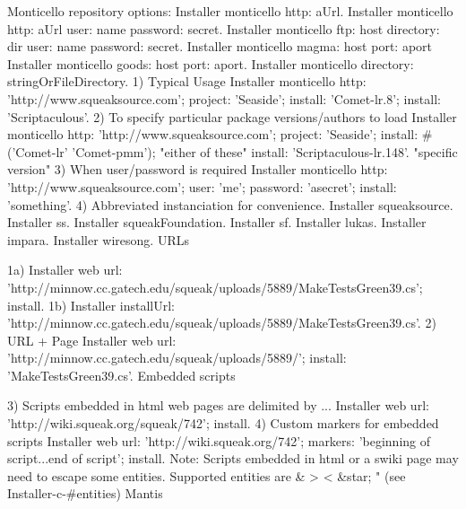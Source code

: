 \documentclass[a4paper,10pt,twoside]{book}
\begin{document}
Monticello repository options:
Installer monticello http: aUrl.
Installer monticello http: aUrl user: name password: secret.
Installer monticello ftp: host directory: dir user: name password: secret.
Installer monticello magma: host port: aport
Installer monticello goods: host port: aport.
Installer monticello directory: stringOrFileDirectory.
1) Typical Usage 
 Installer monticello http: 'http://www.squeaksource.com';
    project: 'Seaside';
    install: 'Comet-lr.8'; 
    install: 'Scriptaculous'.
2) To specify particular package versions/authors to load
 Installer monticello http: 'http://www.squeaksource.com';
       project: 'Seaside';
       install: #('Comet-lr' 'Comet-pmm');  "either of these"
       install: 'Scriptaculous-lr.148'. "specific version"
3) When user/password is required
 Installer monticello http: 'http://www.squeaksource.com';
    user: 'me'; password: 'asecret';
    install: 'something'.
4) Abbreviated instanciation for convenience.
Installer squeaksource.
Installer ss.
Installer squeakFoundation.
Installer sf.
Installer lukas.
Installer impara.
Installer wiresong.
URLs

1a)
Installer web url: 'http://minnow.cc.gatech.edu/squeak/uploads/5889/MakeTestsGreen39.cs'; install.
1b)
Installer installUrl: 'http://minnow.cc.gatech.edu/squeak/uploads/5889/MakeTestsGreen39.cs'.
2) URL + Page
 Installer web 
     url: 'http://minnow.cc.gatech.edu/squeak/uploads/5889/';
     install: 'MakeTestsGreen39.cs'.
Embedded scripts

3) Scripts embedded in html web pages are delimited by ...
Installer web url: 'http://wiki.squeak.org/squeak/742'; install.
4) Custom markers for embedded scripts
Installer web
 url: 'http://wiki.squeak.org/742';
 markers: 'beginning of script...end of script';
 install.
Note: Scripts embedded in html or a swiki page may need to escape some entities.
Supported entities are & > < &star; " (see Installer-c-#entities)
Mantis
\end{document}
